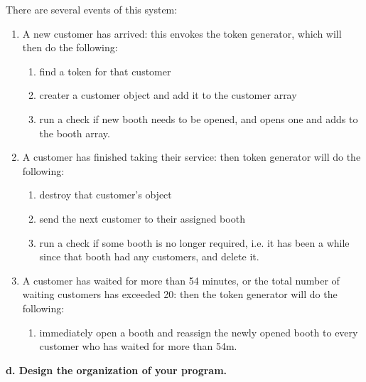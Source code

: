 \documentclass[article, 11pt, a4paper]{memoir}
\begin{document}
\begin{solution}
    [c]
    There are several events of this system:
    \begin{enumerate}
        \item A new customer has arrived: this envokes the token generator, which will
            then do the following:
            \begin{enumerate}
                \item find a token for that customer
                \item creater a customer object and add it to the customer array
                \item run a check if new booth needs to be opened, and opens one and adds
                    to the booth array.
            \end{enumerate}
        \item A customer has finished taking their service: then token generator will do
            the following:
            \begin{enumerate}
                \item destroy that customer's object
                \item send the next customer to their assigned booth
                \item run a check if some booth is no longer required, i.e. it has been a
                    while since that booth had any customers, and delete it.
            \end{enumerate}
        \item A customer has waited for more than 54 minutes, or the total number of
            waiting customers has exceeded 20: then the token generator will do the
            following:
            \begin{enumerate}
                \item immediately open a booth and reassign the newly opened booth to
                    every customer who has waited for more than 54m.
            \end{enumerate}
    \end{enumerate}
\end{solution}

\textbf{d. Design the organization of your program.}
\vspace{1em}
\end{document}

